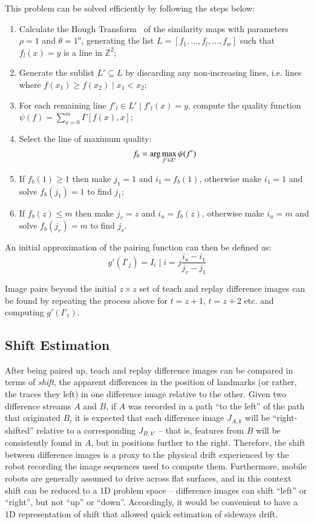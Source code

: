 \documentclass[twocolumn, 9pt,fleqn]{jsproceedings}
\begin{document}
This problem can be solved efficiently by following the steps below:

\begin{enumerate}
\item Calculate the Hough Transform~\cite{DUD72} of the similarity maps with parameters $\rho = 1$ and $\theta = 1^o$, generating the list \mbox{$L = [f_1, \dotsc, f_l, \dotsc, f_w]$} such that $f_l(x) = y$ is a line in $\mathbb{Z}^2$;
\item Generate the sublist $L' \subseteq L$ by discarding any non-increasing lines, i.e. lines where $f(x_1) \geq f(x_2) \; | \; x_1 < x_2$;
\item For each remaining line $f'_l \in L' \; | \; f'_l(x) = y$, compute the quality function $\psi(f) = \sum_{x = 0}^{m} \Gamma[f(x), x]$;
\item Select the line of maximum quality:
\begin{equation}
f_b = \arg \max_{f' \in L'} {\psi(f')} \notag
\end{equation}
\item If $f_b(1) \geq 1$ then make $j_1 = 1$ and $i_1 = f_b(1)$, otherwise make $i_1 = 1$ and solve $f_b(j_1) = 1$ to find $j_1$;
\item If $f_b(z) \leq m$ then make $j_v = z$ and $i_u = f_b(z)$, otherwise make $i_u = m$ and solve $f_b(j_v) = m$ to find $j_v$.
\end{enumerate}

An initial approximation of the pairing function can then be defined as:
\begin{equation}
g'(I'_j) = I_i \; | \; i = j \frac{i_u - i_1}{j_v - j_1}
\end{equation}

Image pairs beyond the initial $z \times z$ set of teach and replay difference images can be found by repeating the process above for $t = z + 1$, $t = z + 2$ etc. and computing $g'(I'_t)$.

\subsection{Shift Estimation}

After being paired up, teach and replay difference images can be compared in terms of \textit{shift}, the apparent differences in the position of landmarks (or rather, the traces they left) in one difference image relative to the other. Given two difference streams $A$ and $B$, if $A$ was recorded in a path ``to the left'' of the path that originated $B$, it is expected that each difference image $J_{A,k}$ will be ``right-shifted'' relative to a corresponding $J_{B,k'}$ -- that is, features from $B$ will be consistently found in $A$, but in positions further to the right. Therefore, the shift between difference images is a proxy to the physical drift experienced by the robot recording the image sequences used to compute them. Furthermore, mobile robots are generally assumed to drive across flat surfaces, and in this context shift can be reduced to a 1D problem space -- difference images can shift ``left'' or ``right'', but not ``up'' or ``down''. Accordingly, it would be convenient to have a 1D representation of shift that allowed quick estimation of sideways drift.
\end{document}
